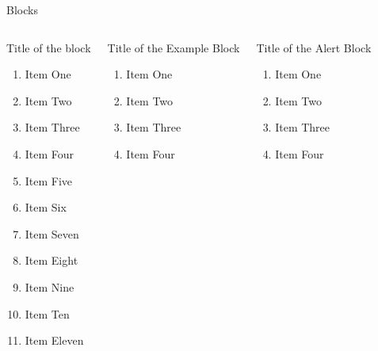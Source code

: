 \documentclass[12pt,aspect=169]{beamer}
\begin{document}
\begin{frame}{Blocks}
\scriptsize
\begin{columns}[T]
\begin{block}{Title of the block}
\begin{enumerate}
	\item Item One
	\item Item Two
	\item Item Three
	\item Item Four
	\item Item Five	
	\item Item Six
	\item Item Seven
	\item Item Eight	
	\item Item Nine
	\item Item Ten
	\item Item Eleven
\end{enumerate}

\end{block}

\begin{exampleblock}{Title of the Example Block}
\begin{enumerate}
	\item Item One
	\item Item Two
	\item Item Three
	\item Item Four
\end{enumerate}

\end{exampleblock}

\begin{alertblock}{Title of the Alert Block}
\begin{enumerate}
	\item Item One
	\item Item Two
	\item Item Three
	\item Item Four
\end{enumerate}

\end{alertblock}
\end{columns}
\end{frame}
\end{document}
